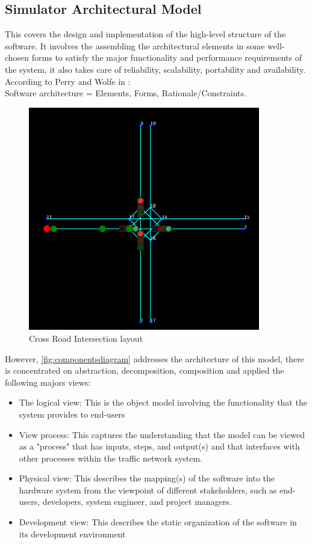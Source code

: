 \documentclass{book}
\begin{document}
\subsection{Simulator Architectural Model}
This covers the design and implementation  of the high-level structure of the software. It involves the assembling the architectural elements in some well-chosen forms to satisfy the major functionality and performance requirements of the system, it also takes care of reliability, scalability, portability and availability. According to  Perry and Wolfe in \cite{kruchten2005architectural}:\\ Software architecture = {Elements, Forms, Rationale/Constraints}.\\
\begin{figure}[htbp]
  \centering
  \includegraphics[width=0.9\textwidth]{crossjunctionsnap}
  \caption{Cross Road Intersection layout}
  \label{fig:componentsdiagram1}
\end{figure}
However, \cref{fig:componentsdiagram} addresses the architecture of this model, there is  concentrated on abstraction, decomposition, composition and applied the following majors views:
\begin{itemize}
    \item The logical view: This is the object model involving the functionality that the system provides to end-users
    \item View process: This captures the understanding that the model can be viewed as a "process" that has inputs, steps, and output(s) and that interfaces with other processes within the traffic network system.
    \item Physical view: This describes the mapping(s) of the software into the hardware system from the viewpoint of different stakeholders, such as end-users, developers, system engineer, and project managers.
    \item Development view: This describes the static organization of the software in its development
environment
\end{itemize}
\end{document}
